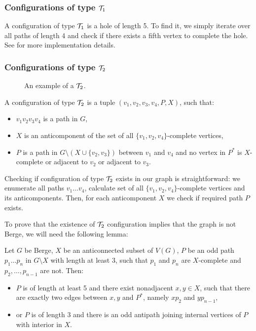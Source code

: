 \subsubsection{Configurations of type $\mathcal{T}_1$}

A configuration of type $\mathcal{T}_1$ is a hole of length 5. To find it, we simply iterate over all paths of length 4 and check if there exists a fifth vertex to complete the hole. See  for more implementation details.

\subsubsection{Configurations of type $\mathcal{T}_2$}

\begin{wrapfigure}{r}{0.35\textwidth}
	
	\caption{An example of a $\mathcal{T}_2$.}%
	\vspace{-1.5cm}
\end{wrapfigure}

A configuration of type $\mathcal{T}_2$ is a tuple $(v_1, v_2, v_3, v_4, P, X)$, such that:
\begin{itemize}
	\item $v_1v_2v_3v_4$ is a path in $G$,
	\item $X$ is an anticomponent of the set of all $\{v_1, v_2, v_4\}$-complete vertices,
	\item $P$ is a path in $G\setminus(X \cup \{v_2, v_3\})$ between $v_1$ and $v_4$ and no vertex in $P^*$ is $X$-complete or adjacent to $v_2$ or adjacent to $v_3$.
\end{itemize}

Checking if configuration of type $\mathcal{T}_2$ exists in our graph is straightforward: we enumerate all paths $v_1\ldots v_4$, calculate set of all $\{v_1, v_2, v_4\}$-complete vertices and its anticomponents. Then, for each anticomponent $X$ we check if required path $P$ exists.

To prove that the existence of $\mathcal{T}_2$ configuration implies that the graph is not Berge, we will need the following lemma:

\begin{lemma}\label{lem:Roussel-Rubio}
	Let $G$ be Berge, $X$ be an anticonnected subset of $V(G)$, $P$ be an odd path $p_1\ldots p_n$ in $G\setminus X$ with length at least 3, such that $p_1$ and $p_n$ are $X$-complete and $p_2, \ldots, p_{n-1}$ are not. Then:
	\begin{itemize}
		\item $P$ is of length at least 5 and there exist nonadjacent $x, y \in X$, such that there are exactly two edges between $x, y$ and $P^*$, namely $xp_2$ and $yp_{n-1}$,
		\item or $P$ is of length 3 and there is an odd antipath joining internal vertices of $P$ with interior in $X$.
	\end{itemize}
\end{lemma}

